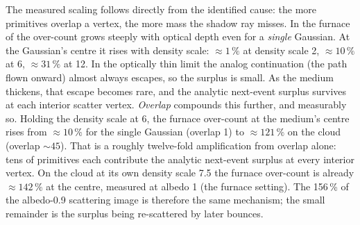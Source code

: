 The measured scaling follows directly from the identified cause: the more primitives
overlap a vertex, the more mass the shadow ray misses. In the furnace of
 the over-count grows steeply with optical depth even for a \emph{single}
Gaussian. At the Gaussian's centre it rises with density scale: ${\approx}\num{1}\,\%$ at density
scale \num{2}, ${\approx}\num{10}\,\%$ at \num{6}, ${\approx}\num{31}\,\%$ at \num{12}. In the
optically thin limit the analog continuation (the path flown onward) almost always escapes, so
the surplus is small. As
the medium thickens, that escape becomes rare, and the analytic next-event
surplus survives at each interior scatter vertex. \emph{Overlap} compounds this further, and measurably
so. Holding the density scale at \num{6}, the furnace over-count at the medium's centre rises from
${\approx}\num{10}\,\%$ for the single Gaussian (overlap \num{1}) to ${\approx}\num{121}\,\%$ on
the cloud (overlap ${\sim}\num{45}$). That is a roughly twelve-fold amplification from overlap
alone: tens of primitives each contribute the analytic next-event surplus at every interior
vertex. On the cloud at its own density scale \num{7.5} the furnace over-count is already
${\approx}\num{142}\,\%$ at the centre, measured at albedo \num{1} (the furnace setting). The
\num{+156}\,\% of the albedo-\num{0.9} scattering image is therefore the same mechanism; the small
remainder is the surplus being re-scattered by later bounces.

